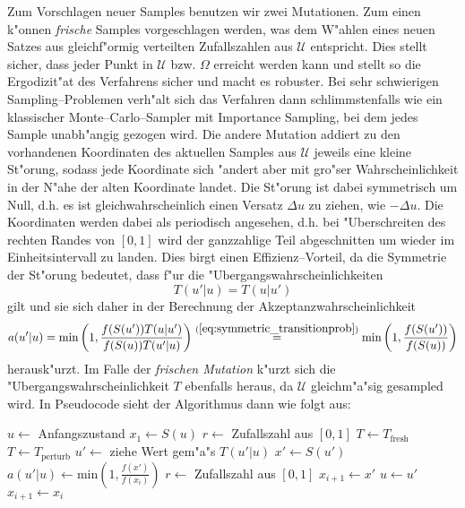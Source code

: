 	Zum Vorschlagen neuer Samples benutzen wir zwei Mutationen. Zum einen k"onnen {\em frische} Samples vorgeschlagen werden, was dem W"ahlen eines neuen Satzes aus gleichf"ormig verteilten Zufallszahlen aus $\mathcal{U}$ entspricht. Dies stellt sicher, dass jeder Punkt in $\mathcal{U}$ bzw. $\Omega$ erreicht werden kann und stellt so die Ergodizit"at des Verfahrens sicher und macht es robuster. Bei sehr schwierigen Sampling--Problemen verh"alt sich das Verfahren dann schlimmstenfalls wie ein klassischer Monte--Carlo--Sampler mit Importance Sampling, bei dem jedes Sample unabh"angig gezogen wird.
	Die andere Mutation addiert zu den vorhandenen Koordinaten des aktuellen Samples aus $\mathcal{U}$ jeweils eine kleine St"orung, sodass jede Koordinate sich "andert aber mit gro"ser Wahrscheinlichkeit in der N"ahe der alten Koordinate landet. Die St"orung ist dabei symmetrisch um Null, d.h. es ist gleichwahrscheinlich einen Versatz $\Delta u$ zu ziehen, wie $-\Delta u$. Die Koordinaten werden dabei als periodisch angesehen, d.h. bei "Uberschreiten des rechten Randes von $[0,1]$ wird der ganzzahlige Teil abgeschnitten um wieder im Einheitsintervall zu landen. Dies birgt einen Effizienz--Vorteil, da die Symmetrie der St"orung bedeutet, dass f"ur die "Ubergangswahrscheinlichkeiten
	\begin{equation}
	  T(u'|u)=T(u|u')
	  \label{eq:symmetric_transitionprob}
	\end{equation}
	gilt und sie sich daher in der Berechnung der Akzeptanzwahrscheinlichkeit
	$$a(u'|u)=\text{min}\left(1,\frac{f(S(u'))T(u|u')}{f(S(u))T(u'|u)}\right)\stackrel{(\ref{eq:symmetric_transitionprob})}{=}\text{min}\left(1,\frac{f(S(u'))}{f(S(u))}\right)$$
	herausk"urzt. Im Falle der {\em frischen Mutation} k"urzt sich die "Ubergangswahrscheinlichkeit $T$ ebenfalls heraus, da $\mathcal{U}$ gleichm"a"sig gesampled wird.
	In Pseudocode sieht der Algorithmus dann wie folgt aus:
	\begin{algorithmic}
		\STATE $u \leftarrow$ Anfangszustand
		\STATE $x_1 \leftarrow S(u)$
			\STATE $r\leftarrow$ Zufallszahl aus $[0,1]$
						\STATE $T \leftarrow T_\text{fresh}$
				\STATE $T \leftarrow T_\text{perturb}$
			\ENDIF
			\STATE $u'\leftarrow$ ziehe Wert gem"a"s $T(u'|u)$
			\STATE $x' \leftarrow S(u')$
			\STATE $a(u'|u) \leftarrow \text{min}\left(1,\frac{f(x')}{f(x_i)}\right)$
			\STATE $r\leftarrow$ Zufallszahl aus $[0,1]$
			  \STATE $x_{i+1} \leftarrow x'$
			  \STATE $u \leftarrow u'$
			\ELSE	\STATE $x_{i+1} \leftarrow x_i$
			\ENDIF
	  \ENDFOR
	\end{algorithmic}

